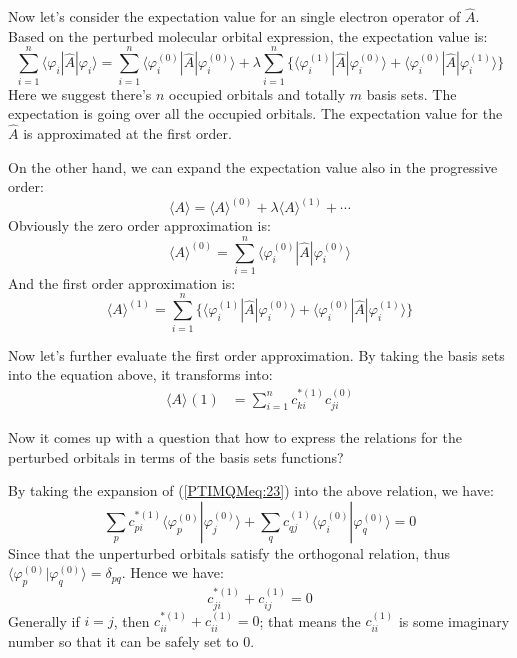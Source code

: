 Now let's consider the expectation value for an single electron
operator of $\hat{A}$. Based on the perturbed molecular orbital
expression, the expectation value is:
\begin{equation}\label{}
\sum_{i=1}^{n}\langle\varphi_{i}|\hat{A}|\varphi_{i}\rangle =
\sum_{i=1}^{n}\langle\varphi^{(0)}_{i}|\hat{A}|\varphi^{(0)}_{i}\rangle
+ \lambda\sum_{i=1}^{n}\Bigg\{
\langle\varphi^{(1)}_{i}|\hat{A}|\varphi^{(0)}_{i}\rangle +
\langle\varphi^{(0)}_{i}|\hat{A}|\varphi^{(1)}_{i}\rangle \Bigg\}
\end{equation}
Here we suggest there's $n$ occupied orbitals and totally $m$ basis
sets. The expectation is going over all the occupied orbitals. The
expectation value for the $\hat{A}$ is approximated at the first
order.

On the other hand, we can expand the expectation value also in the
progressive order:
\begin{equation}\label{}
\langle A \rangle = \langle A \rangle^{(0)} + \lambda\langle A
\rangle^{(1)} + \cdots
\end{equation}
Obviously the zero order approximation is:
\begin{equation}\label{}
\langle A \rangle^{(0)} =
\sum_{i=1}^{n}\langle\varphi^{(0)}_{i}|\hat{A}|\varphi^{(0)}_{i}\rangle
\end{equation}
And the first order approximation is:
\begin{equation}\label{}
\langle A \rangle^{(1)} = \sum_{i=1}^{n}\Bigg\{
\langle\varphi^{(1)}_{i}|\hat{A}|\varphi^{(0)}_{i}\rangle +
\langle\varphi^{(0)}_{i}|\hat{A}|\varphi^{(1)}_{i}\rangle \Bigg\}
\end{equation}

Now let's further evaluate the first order approximation. By taking
the basis sets into the equation above, it transforms into:
\begin{align}\label{}
\langle A \rangle^{}(1) &= \sum_{i=1}^{n}c^{*(1)}_{ki}c^{(0)}_{ji}
\end{align}


Now it comes up with a question that how to express the relations
for the perturbed orbitals in terms of the basis sets functions?

By taking the expansion of (\ref{PTIMQMeq:23}) into the above
relation, we have:
\begin{equation}\label{}
\sum_{p}c^{*(1)}_{pi}\langle\varphi^{(0)}_{p}|\varphi^{(0)}_{j}\rangle
+
\sum_{q}c^{(1)}_{qj}\langle\varphi^{(0)}_{i}|\varphi^{(0)}_{q}\rangle
= 0
\end{equation}
Since that the unperturbed orbitals satisfy the orthogonal relation,
thus $\langle\varphi^{(0)}_{p}|\varphi^{(0)}_{q}\rangle =
\delta_{pq}$. Hence we have:
\begin{equation}\label{PTIMQMeq:28}
c^{*(1)}_{ji} + c^{(1)}_{ij} = 0
\end{equation}
Generally if $i=j$, then $c^{*(1)}_{ii} + c^{(1)}_{ii} = 0$; that
means the $c^{(1)}_{ii}$ is some imaginary number so that it can be
safely set to $0$.

